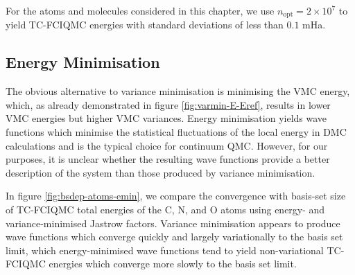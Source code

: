 For the atoms and molecules considered in this chapter, we use $n_\mathrm{opt}=2\times 10^7$ to yield TC-FCIQMC energies with standard deviations of less than $0.1$ mHa.

\subsection{Energy Minimisation}

The obvious alternative to variance minimisation is minimising the VMC energy,\supercite{nightingaleOptimization2001,toulouseOptimization2007,umrigarAlleviation2007} which, as already demonstrated in figure \ref{fig:varmin-E-Eref}, results in lower VMC energies but higher VMC variances.
Energy minimisation yields wave functions which minimise the statistical fluctuations of the local energy in DMC calculations\supercite{ceperleyStatistical1986} and is the typical choice for continuum QMC. However, for our purposes, it is unclear whether the resulting wave functions provide a better description of the system than those produced by variance minimisation.

In figure \ref{fig:bsdep-atoms-emin}, we compare the convergence with basis-set size of TC-FCIQMC total energies of the C, N, and O atoms using energy- and variance-minimised Jastrow factors. Variance minimisation appears to produce wave functions which converge quickly and largely variationally to the basis set limit, which energy-minimised wave functions tend to yield non-variational TC-FCIQMC energies which converge more slowly to the basis set limit.

